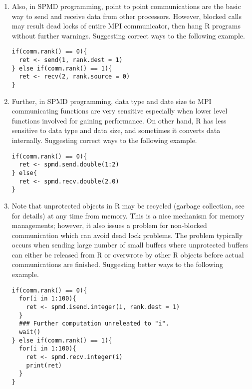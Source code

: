 \begin{enumerate}[label=\thechapter-\arabic*]
\item
Also, in SPMD programming, point to point communications are the basic way
to send and receive data from other processors. However, blocked calls may
result dead locks of entire MPI communicator, then hang R programs without
further warnings. Suggesting correct ways to the following example.
\begin{lstlisting}[language=rr,title=R Code]
if(comm.rank() == 0){
  ret <- send(1, rank.dest = 1)
} else if(comm.rank() == 1){
  ret <- recv(2, rank.source = 0)
}
\end{lstlisting}

\item
Further, in SPMD programming, data type and date size to MPI communicating
functions are very sensitive especially when lower level functions involved
for gaining performance. On other hand, R has less sensitive to data type
and data size, and sometimes it converts data internally.
Suggesting correct ways to the following example.
\begin{lstlisting}[language=rr,title=R Code]
if(comm.rank() == 0){
  ret <- spmd.send.double(1:2)
} else{
  ret <- spmd.recv.double(2.0)
}
\end{lstlisting}

\item
Note that unprotected objects in R may be recycled (garbage collection, see
 for details) at any time from memory. This is a nice mechanism for
memory managements; however, it also issues a problem for non-blocked
communication which can avoid dead lock problems. The problem typically occurs
when sending large number of small buffers where unprotected buffers can
either be released from R or overwrote by other R objects before actual
communications are finished. Suggesting better ways to the following example.
\begin{lstlisting}[language=rr,title=R Code]
if(comm.rank() == 0){
  for(i in 1:100){
    ret <- spmd.isend.integer(i, rank.dest = 1)
  }
  ### Further computation unreleated to "i".
  wait()
} else if(comm.rank() == 1){
  for(i in 1:100){
    ret <- spmd.recv.integer(i)
    print(ret)
  }
}
\end{lstlisting}


\end{enumerate}

